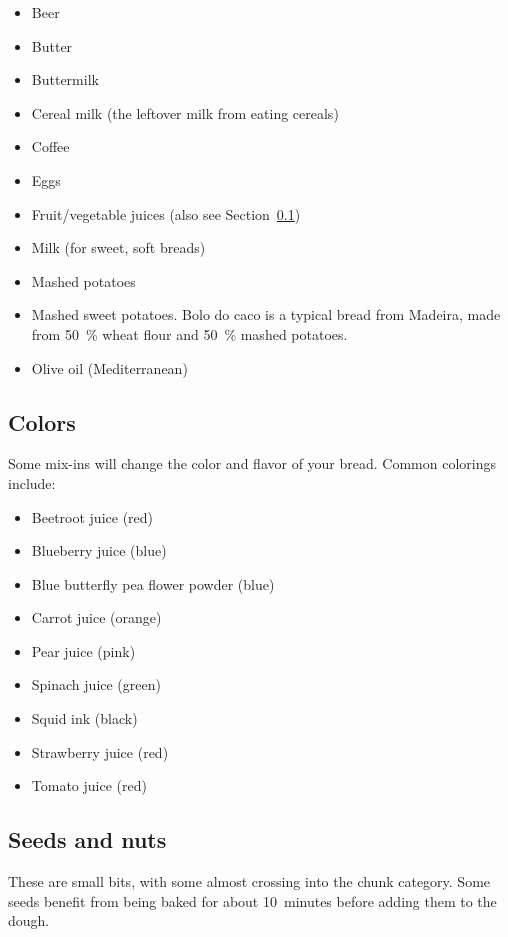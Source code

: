 \begin{itemize}
  \item Beer
  \item Butter
  \item Buttermilk
  \item Cereal milk (the leftover milk from eating cereals)
  \item Coffee
  \item Eggs
  \item Fruit/vegetable juices (also see Section~\ref{section:colors})
  \item Milk (for sweet, soft breads)
  \item Mashed potatoes
  \item Mashed sweet potatoes. Bolo do caco is a typical bread from Madeira,
    made from \qty{50}{\percent} wheat flour and \qty{50}{\percent} mashed potatoes.
  \item Olive oil (Mediterranean)
\end{itemize}

\subsection{Colors}
\label{section:colors}
Some mix-ins will change the color and flavor of your bread. Common colorings
include:

\begin{itemize}
  \item Beetroot juice (red)
  \item Blueberry juice (blue)
  \item Blue butterfly pea flower powder (blue)
  \item Carrot juice (orange)
  \item Pear juice (pink)
  \item Spinach juice (green)
  \item Squid ink (black)
  \item Strawberry juice (red)
  \item Tomato juice (red)
\end{itemize}

\subsection{Seeds and nuts}
These are small bits, with some almost crossing into the chunk category. Some
seeds benefit from being baked for about 10~minutes before adding them to the
dough.


